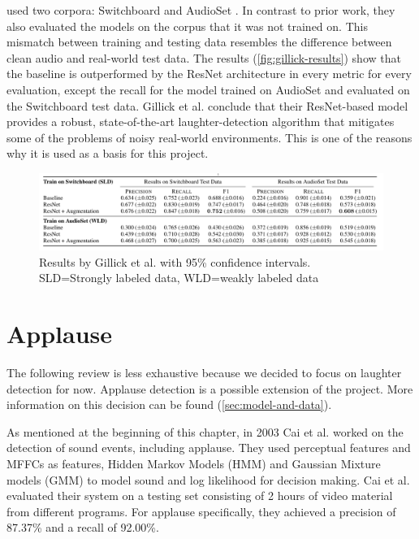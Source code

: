 \documentclass[bsc,frontabs,parskip,deptreport]{infthesis}
\begin{document}
\citeauthor{gillick2021robust} used two corpora: Switchboard \citep{switchboard-corpus} and AudioSet \citep{googleaudioset}.
In contrast to prior work, they also evaluated the models on the corpus that it was not trained on.
This mismatch between training and testing data resembles the difference between clean audio and real-world test data.
The results (\autoref{fig:gillick-results}) show that the baseline is outperformed by the ResNet architecture in every metric for every evaluation, except the recall for the model trained on AudioSet and evaluated on the Switchboard test data. 
Gillick et al. conclude that their ResNet-based model provides a robust, state-of-the-art laughter-detection algorithm that mitigates some of the problems of noisy real-world environments. This is one of the reasons why it is used as a basis for this project.

\begin{figure}[h!]
    \centering
    \includegraphics[width=14cm]{imgs/results/gillick_et_al.png}
    \caption{Results by Gillick et al. with 95\% confidence intervals. SLD=Strongly labeled data, WLD=weakly labeled data}
    \label{fig:gillick-results}
\end{figure}

\section{Applause}
The following review is less exhaustive because we decided to focus on laughter detection for now. Applause detection is a possible extension of the project. 
More information on this decision can be found (\autoref{sec:model-and-data}).

As mentioned at the beginning of this chapter, in 2003 Cai et al. \citep{cai2003highlight} worked on the detection of sound events, including applause.
They used perceptual features and MFFCs as features, Hidden Markov Models (HMM) and Gaussian Mixture models (GMM) to model sound and log likelihood for decision making.
Cai et al. evaluated their system on a testing set consisting of 2 hours of video material from different programs.
For applause specifically, they achieved a precision of 87.37\% and a recall of 92.00\%.
\end{document}
